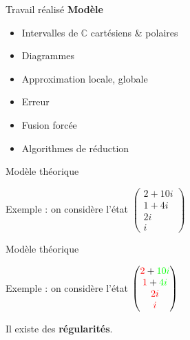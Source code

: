 \begin{frame}{Travail réalisé}
  \textbf{Modèle}
  \begin{itemize}
      \item[\checkmark] Intervalles de $\mathbb C$ cartésiens \& polaires
      \item[\checkmark] Diagrammes
      \item[\checkmark] Approximation locale, globale
      \item[\checkmark] Erreur
      \item[\checkmark] Fusion forcée
      \item[\checkmark] Algorithmes de réduction
  \end{itemize}
\end{frame}

\begin{frame}{Modèle théorique}

  Exemple : on considère l'état $\begin{pmatrix}
  2+10i \\ 1+4i \\ 2i \\ i
  \end{pmatrix}$

\end{frame}

\begin{frame}{Modèle théorique} %

  Exemple : on considère l'état $\begin{pmatrix}
  \color{red} 2\color{black}+\color{green}10i \\ \color{red} 1\color{black}+\color{green}4i \\ \color{red}{2i} \\ \color{red}{i}
  \end{pmatrix}$

  \vspace{1em}
  Il existe des \textbf{régularités}.
\end{frame}


